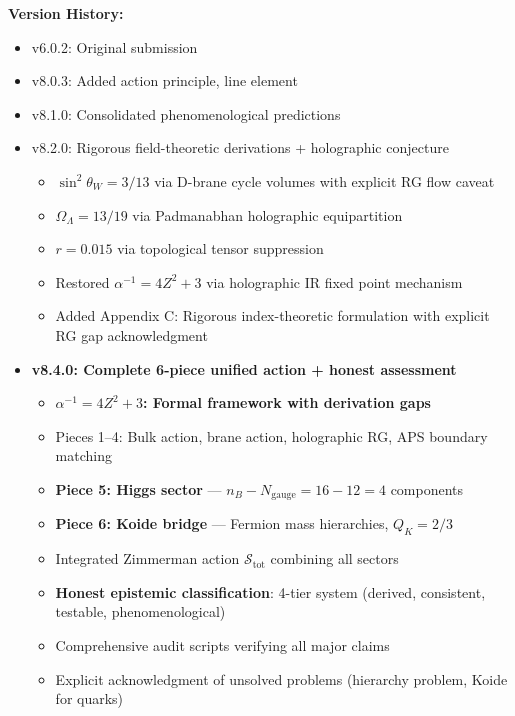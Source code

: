 \documentclass[12pt,a4paper]{article}
\newcommand{\OmegaL}{\Omega_\Lambda}
\newcommand{\sinW}{\sin^2\theta_W}
\newcommand{\Zsq}{Z^2}
\begin{document}
\textbf{Version History:}
\begin{itemize}[itemsep=0pt]
    \item v6.0.2: Original submission
    \item v8.0.3: Added action principle, line element
    \item v8.1.0: Consolidated phenomenological predictions
    \item v8.2.0: Rigorous field-theoretic derivations + holographic conjecture
    \begin{itemize}[itemsep=0pt]
        \item $\sinW = 3/13$ via D-brane cycle volumes with explicit RG flow caveat
        \item $\OmegaL = 13/19$ via Padmanabhan holographic equipartition
        \item $r = 0.015$ via topological tensor suppression
        \item Restored $\alpha^{-1} = 4\Zsq + 3$ via holographic IR fixed point mechanism
        \item Added Appendix C: Rigorous index-theoretic formulation with explicit RG gap acknowledgment
    \end{itemize}
    \item \textbf{v8.4.0: Complete 6-piece unified action + honest assessment}
    \begin{itemize}[itemsep=0pt]
        \item \textbf{$\alpha^{-1} = 4\Zsq + 3$: Formal framework with derivation gaps}
        \item Pieces 1--4: Bulk action, brane action, holographic RG, APS boundary matching
        \item \textbf{Piece 5: Higgs sector} --- $n_B - N_{\text{gauge}} = 16 - 12 = 4$ components
        \item \textbf{Piece 6: Koide bridge} --- Fermion mass hierarchies, $Q_K = 2/3$
        \item Integrated Zimmerman action $\mathcal{S}_{\text{tot}}$ combining all sectors
        \item \textbf{Honest epistemic classification}: 4-tier system (derived, consistent, testable, phenomenological)
        \item Comprehensive audit scripts verifying all major claims
        \item Explicit acknowledgment of unsolved problems (hierarchy problem, Koide for quarks)
    \end{itemize}
\end{itemize}
\end{document}
